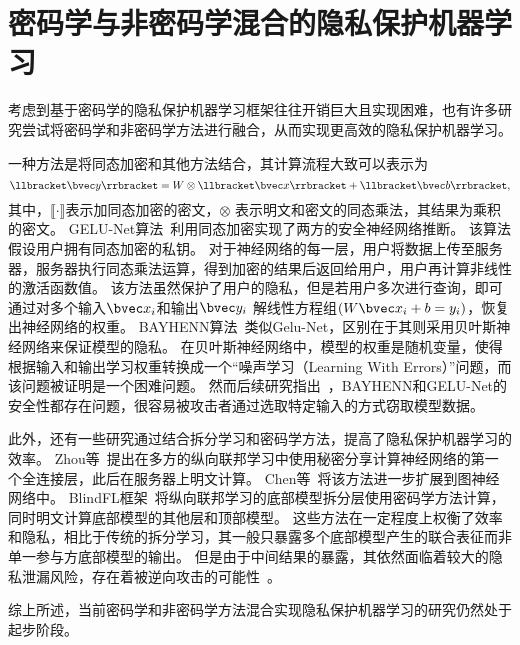 \section{密码学与非密码学混合的隐私保护机器学习}
考虑到基于密码学的隐私保护机器学习框架往往开销巨大且实现困难，也有许多研究尝试将密码学和非密码学方法进行融合，从而实现更高效的隐私保护机器学习。
%

一种方法是将同态加密和其他方法结合，其计算流程大致可以表示为
\begin{equation}
    \llbracket \bvec y \rrbracket = W \otimes \llbracket \bvec x \rrbracket  + \llbracket \bvec b \rrbracket,
\end{equation}
其中，$\llbracket \cdot \rrbracket$表示加同态加密的密文，$\otimes$ 表示明文和密文的同态乘法，其结果为乘积的密文。
%
GELU-Net算法~\cite{zhangqiao_2018_gelu_net}利用同态加密实现了两方的安全神经网络推断。
该算法假设用户拥有同态加密的私钥。
对于神经网络的每一层，用户将数据上传至服务器，服务器执行同态乘法运算，得到加密的结果后返回给用户，用户再计算非线性的激活函数值。
%
该方法虽然保护了用户的隐私，但是若用户多次进行查询，即可通过对多个输入$\bvec x_i$和输出$\bvec y_i$ 解线性方程组$(W\bvec x_i + b = y_i)$，恢复出神经网络的权重。
%
BAYHENN算法~\cite{xiepeichen_2019_bayhenn}类似Gelu-Net，区别在于其则采用贝叶斯神经网络来保证模型的隐私。
在贝叶斯神经网络中，模型的权重是随机变量，使得根据输入和输出学习权重转换成一个“噪声学习（Learning With Errors）”问题，而该问题被证明是一个困难问题。
%
然而后续研究指出~\cite{wong_2020_lwe_model}，BAYHENN和GELU-Net的安全性都存在问题，很容易被攻击者通过选取特定输入的方式窃取模型数据。

此外，还有一些研究通过结合拆分学习和密码学方法，提高了隐私保护机器学习的效率。
Zhou等~\cite{zhou_2022_codesign}提出在多方的纵向联邦学习中使用秘密分享计算神经网络的第一个全连接层，此后在服务器上明文计算。
Chen等~\cite{chen2020vertically}将该方法进一步扩展到图神经网络中。
%
BlindFL框架~\cite{fu2022blindfl}将纵向联邦学习的底部模型拆分层使用密码学方法计算，同时明文计算底部模型的其他层和顶部模型。
%
这些方法在一定程度上权衡了效率和隐私，相比于传统的拆分学习，其一般只暴露多个底部模型产生的联合表征而非单一参与方底部模型的输出。
%
但是由于中间结果的暴露，其依然面临着较大的隐私泄漏风险，存在着被逆向攻击的可能性~\cite{hezecheng_2019_model_inversion_attack,abuadbba2020can_split,luoxinjian2021feature_attack,erdogan2022unsplit,qiupengyu_2023_label_selling_you_out}。

综上所述，当前密码学和非密码学方法混合实现隐私保护机器学习的研究仍然处于起步阶段。
%

